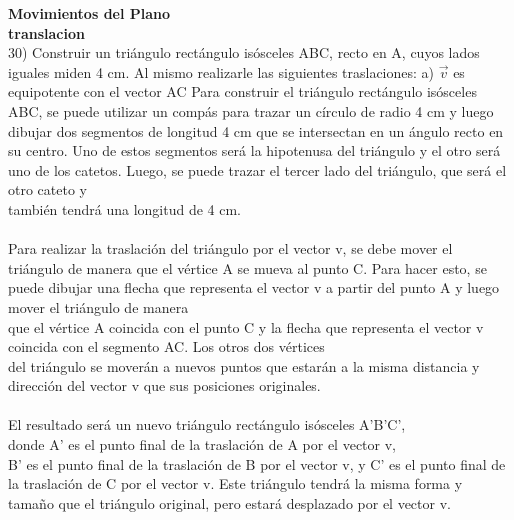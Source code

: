 \documentclass{article}
\begin{document}
{\LARGE \textbf{Movimientos del Plano }} \\
{\large \textbf{translacion}} \\
30) Construir un triángulo rectángulo isósceles ABC, recto en A, cuyos lados iguales miden 4 cm. Al mismo realizarle las siguientes traslaciones:
a) $\vec{v}$ es equipotente con el vector AC
Para construir el triángulo rectángulo isósceles ABC, se puede utilizar un compás para trazar un círculo de radio 4 cm y luego dibujar dos segmentos de longitud 4 cm que se intersectan en un ángulo recto en su centro. Uno de estos segmentos será la hipotenusa del triángulo y el otro será uno de los catetos. Luego, se puede trazar el tercer lado del triángulo, que será el otro cateto y\\
también tendrá una longitud de 4 cm.\\
\\
Para realizar la traslación del triángulo por el vector v, se debe mover el triángulo de manera que el vértice A se mueva al punto C. Para hacer esto, se puede dibujar una flecha que representa el vector v a partir del punto A y luego mover el triángulo de manera\\
que el vértice A coincida con el punto C y la flecha que representa el vector v coincida con el segmento AC. Los otros dos vértices\\
del triángulo se moverán a nuevos puntos que estarán a la misma distancia y dirección del vector v que sus posiciones originales.\\
\\
El resultado será un nuevo triángulo rectángulo isósceles A'B'C',\\
donde A' es el punto final de la traslación de A por el vector v,\\
B' es el punto final de la traslación de B por el vector v, y C' es el punto final de la traslación de C por el vector v. Este triángulo tendrá la misma forma y tamaño que el triángulo original, pero estará desplazado por el vector v.\\
\\
\end{document}
